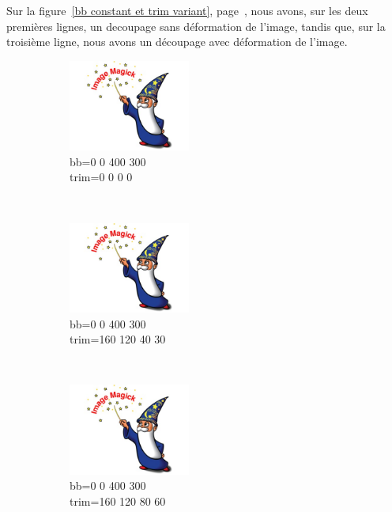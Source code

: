\documentclass[french]{article}
\begin{document}
Sur la figure~\ref{bb constant et trim variant}, page~\pageref{bb constant et trim variant},
nous avons, sur les deux premières lignes, un decoupage sans déformation de l'image, 
tandis que, sur la troisième ligne, nous avons un découpage avec déformation de l'image.

\begin{figure}[h]
    \centering
    \begin{subfigure}[b]{0.3\textwidth}
        \includegraphics[bb=0 0 400 300,trim=0 0 0 0,width=4cm,height=3cm,clip=true]{test.jpg}
        \caption{bb=0 0 400 300\\trim=0 0 0 0}
        \label{essai_4}
    \end{subfigure}
    ~
    \begin{subfigure}[b]{0.3\textwidth}
        \includegraphics[bb=0 0 400 300,trim=160 120 40 30,width=4cm,height=3cm,clip=true]{test.jpg}
        \caption{bb=0 0 400 300\\trim=160 120 40 30}%
        \label{essai_5}
    \end{subfigure}
    ~
    \begin{subfigure}[b]{0.3\textwidth}
        \includegraphics[bb=0 0 400 300,trim=160 120 80 60,width=4cm,height=3cm,clip=true]{test.jpg}
        \caption{bb=0 0 400 300\\trim=160 120 80 60}%
        \label{essai_6}
    \end{subfigure}
    \\
    \begin{subfigure}[b]{0.3\textwidth}

\end{subfigure}
\end{figure}
\end{document}
